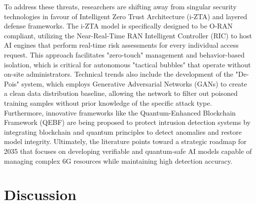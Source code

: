 \documentclass[letterpaper]{article} %
\begin{document}
To address these threats, researchers are shifting away from singular security technologies in favour of Intelligent Zero Trust Architecture (i-ZTA) and layered defense frameworks. The i-ZTA model is specifically designed to be O-RAN compliant, utilizing the Near-Real-Time RAN Intelligent Controller (RIC) to host AI engines that perform real-time risk assessments for every individual access request\cite{Ramezanpour_2022}. This approach facilitates "zero-touch" management and behavior-based isolation, which is critical for autonomous "tactical bubbles" that operate without on-site administrators\cite{Suomalainen_2025}. Technical trends also include the development of the "De-Pois" system, which employs Generative Adversarial Networks (GANs) to create a clean data distribution baseline, allowing the network to filter out poisoned training samples without prior knowledge of the specific attack type\cite{Chen_Zhang_Zhang_Wang_Liu_2021}. Furthermore, innovative frameworks like the Quantum-Enhanced Blockchain Framework (QEBF) are being proposed to protect intrusion detection systems by integrating blockchain and quantum principles to detect anomalies and restore model integrity\cite{Rajesh_2025}. Ultimately, the literature points toward a strategic roadmap for 2035 that focuses on developing verifiable and quantum-safe AI models capable of managing complex 6G resources while maintaining high detection accuracy\cite{Kumar_Dutta_Vamsi_Sankararao_Varri_Puthal_2026}.




\section{Discussion}

\end{document}
